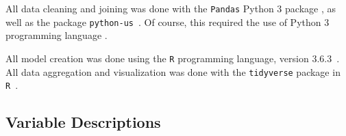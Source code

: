 \documentclass{article}
\begin{document}
All data cleaning and joining was done with the \texttt{Pandas} Python 3 package
\cite{python_pandas}, as well as the package \texttt{python-us}~\cite{python_us}.
Of course, this required the use of Python 3 programming language
\cite{python_lang}.

All model creation was done using the \texttt{R} programming
language, version 3.6.3~\cite{r_lang}.
All data aggregation and visualization was done with the
\texttt{tidyverse} package in \texttt{R}~\cite{r_tidyverse}.

\subsection{Variable Descriptions}\label{sec:variables}

\newcommand\censuscodes{https://www.census.gov/programs-surveys/acs/technical-documentation/code-lists.2018.html}
\newcommand\descentdesc[1]{ Proportion of the population which is of
    #1 descent. See \url{\censuscodes} for more
    pecise definitions.}
\newcommand\descentreason{Ethnicity is tied to socioeconomic status, which
    could in turn be correlated to one's financial status and mental health.
    Variables related to ethnicity were included to control for variation.}
\newcommand\agedescto[2]{Proportion of the population from #1 to #2 years old.}
\newcommand\agedescover[1]{Proportion of the population over #1 years old.}
\newcommand\agereason{Overall economic status could vary with age, so age
    variables were included to control for variation.}
\newcommand\educationdesc[1]{Proportion of the population 25 years of age and
    over whose maximum educational attainment is #1.}
\newcommand\educationreason{Educational attainment can be used as a general
    measure of socioeconomic status. Variables related to educational
    attainment were included to account for variation.}
\newcommand\maritaldesc[1]{Proportion of the population age 15 and older who
    have marital status ``#1".}
\newcommand\maritalreason{Marital status reflects general socioeconomic status.
    Variables related to marital status are included to account for variation.}
\end{document}

